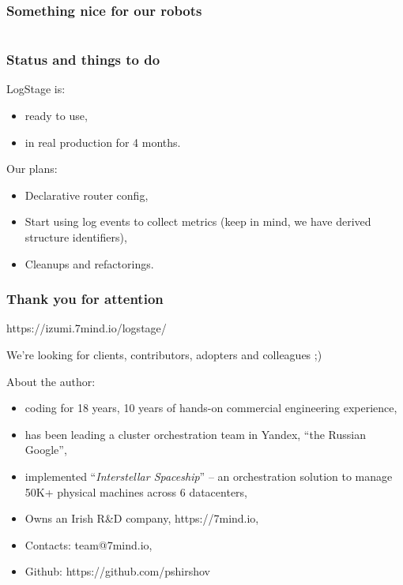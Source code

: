 \documentclass[usenames,dvipsnames]{beamer}
\begin{document}
\begin{frame}
\frametitle{Something nice for our robots}
\begin{figure}
    \inputminted[fontsize=\scriptsize]{json}{target/ex-json-out.tmp}
\end{figure}
\end{frame}

\begin{frame}
\frametitle{Status and things to do}
LogStage is:
\begin{itemize}
\item ready to use,
\item in real production for 4 months.
\end{itemize}
\vspace{0.3cm}
Our plans:
\begin{itemize}
\item Declarative router config,
\item Start using log events to collect metrics (keep in mind, we have derived structure identifiers),
\item Cleanups and refactorings.
\end{itemize}
\end{frame}

\begin{frame}
    \frametitle{Thank you for attention}

    \begin{center}
      https://izumi.7mind.io/logstage/

      We're looking for clients, contributors, adopters and colleagues ;)
    \end{center}

    About the author:
    \begin{itemize}
        \item coding for 18 years, 10 years of hands-on commercial engineering experience,
        \item has been leading a cluster orchestration team in Yandex, ``the Russian Google'',
        \item implemented ``\textit{Interstellar Spaceship}'' -- an orchestration solution to manage 50K+ physical machines across 6 datacenters,
        \item Owns an Irish R\&D company, https://7mind.io,
        \item Contacts: team@7mind.io,
        \item Github: https://github.com/pshirshov
    \end{itemize}
\end{frame}
\end{document}
